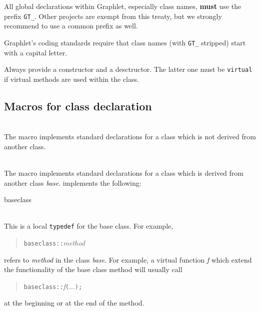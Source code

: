 \documentclass[twoside,fleqn]{report}
\begin{document}
\begin{notes}

  \item All global declarations within Graphlet, especially class
  names, \textbf{must} use the prefix \texttt{GT\_}. Other
  projects are exempt from this treaty, but we strongly recommend
  to use a common prefix as well.
  
  \item Graphlet's coding standards require that class names
  (with \texttt{GT\_} stripped) start with a capital letter.
  
  \item Always provide a constructor and a desctructor. The
  latter one must be \texttt{virtual} if virtual methods are
  used within the class.

\end{notes}


%
%

\subsection{Macros for class declaration}

\begin{Cdefinition}

  \item[\GT{BASE\_CLASS (\Param{class})}] \strut\\
  The macro  implements standard 
  declarations for a class which is not derived from another \Graphlet{} 
  class.
  
  \item[\GT{CLASS (\Param{class}, \Param{base})}] \strut\\
  The macro  implements
  standard declarations for a class which is derived from another
  \Graphlet{} class \emph{base}.   implements the
  following:

  \begin{ttdescription}

    \item[baseclass] \strut\\
    This is a local \texttt{typedef} for the base class.  For
    example,
    \begin{quote}
      \texttt{baseclass::}\emph{method}      
    \end{quote}
    refers to \emph{method} in the class \emph{base}. For
    example, a virtual function \emph{f} which extend the
    functionality of the base class method will usually call
    \begin{quote}
      \texttt{baseclass::}\emph{f}\texttt{($\ldots$);}
    \end{quote}
    at the beginning or at the end of the method.
  \end{ttdescription}
  
\end{Cdefinition}
  
\end{document}
